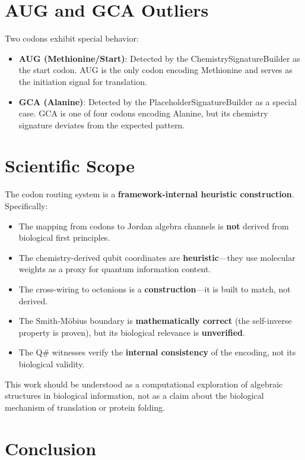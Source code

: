 \documentclass[11pt]{article}
\begin{document}
\section{AUG and GCA Outliers}

Two codons exhibit special behavior:

\begin{itemize}
\item \textbf{AUG (Methionine/Start)}: Detected by the ChemistrySignatureBuilder as the start codon. AUG is the only codon encoding Methionine and serves as the initiation signal for translation.
\item \textbf{GCA (Alanine)}: Detected by the PlaceholderSignatureBuilder as a special case. GCA is one of four codons encoding Alanine, but its chemistry signature deviates from the expected pattern.
\end{itemize}

\section{Scientific Scope}

The codon routing system is a \textbf{framework-internal heuristic construction}. Specifically:

\begin{itemize}
\item The mapping from codons to Jordan algebra channels is \textbf{not} derived from biological first principles.
\item The chemistry-derived qubit coordinates are \textbf{heuristic}---they use molecular weights as a proxy for quantum information content.
\item The cross-wiring to octonions is a \textbf{construction}---it is built to match, not derived.
\item The Smith-M\"obius boundary is \textbf{mathematically correct} (the self-inverse property is proven), but its biological relevance is \textbf{unverified}.
\item The Q\# witnesses verify the \textbf{internal consistency} of the encoding, not its biological validity.
\end{itemize}

This work should be understood as a computational exploration of algebraic structures in biological information, not as a claim about the biological mechanism of translation or protein folding.

\section{Conclusion}
\end{document}
